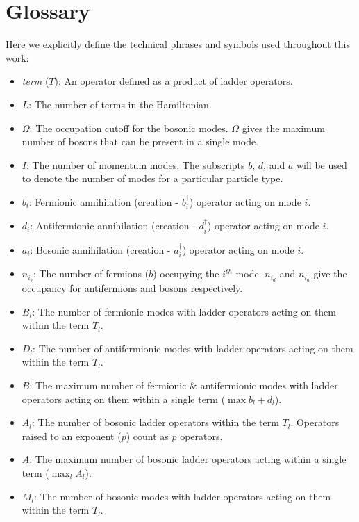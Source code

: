 \section{Glossary}
\label{sec:glossary}

Here we explicitly define the technical phrases and symbols used throughout this work:

\begin{itemize}
    \item \textit{term} ($T$): An operator defined as a product of ladder operators.
    \item $L$: The number of terms in the Hamiltonian.
    \item $\Omega$: The occupation cutoff for the bosonic modes. $\Omega$ gives the maximum number of bosons that can be present in a single mode. 
    \item $I$: The number of momentum modes. The subscripts $b$, $d$, and $a$ will be used to denote the number of modes for a particular particle type.
    \item $b_i$: Fermionic annihilation (creation - $b_i^\dagger$) operator acting on mode $i$.
    \item $d_i$: Antifermionic annihilation (creation - $d_i^\dagger$) operator acting on mode $i$.
    \item $a_i$: Bosonic annihilation (creation - $a_i^\dagger$) operator acting on mode $i$.
    \item $n_{i_b}$: The number of fermions ($b$) occupying the $i^{th}$ mode. $n_{i_d}$ and $n_{i_a}$ give the occupancy for antifermions and bosons respectively.
    \item $B_l$: The number of fermionic modes with ladder operators acting on them within the term $T_l$.
    \item $D_l$: The number of antifermionic modes with ladder operators acting on them within the term $T_l$.
    \item $B$: The maximum number of fermionic \& antifermionic modes with ladder operators acting on them within a single term ($\max{b_l + d_l}$).
    \item $A_l$: The number of bosonic ladder operators within the term $T_l$. Operators raised to an exponent ($p$) count as $p$ operators.
    \item $A$: The maximum number of bosonic ladder operators acting within a single term ($\max_l A_l$). 
    \item $M_l$: The number of bosonic modes with ladder operators acting on them within the term $T_l$.

\end{itemize}
